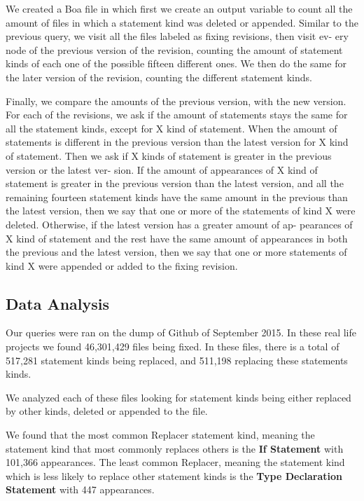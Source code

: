 \documentclass{sig-alternate-05-2015}
\begin{document}
We created a Boa file in which first we create an output variable to count all the amount of files in which a statement kind was deleted or appended. Similar to the previous query, we visit all the files labeled as fixing revisions, then visit ev- ery node of the previous version of the revision, counting the amount of statement kinds of each one of the possible fifteen different ones. We then do the same for the later version of the revision, counting the different statement kinds.

Finally, we compare the amounts of the previous version, with the new version. For each of the revisions, we ask if the amount of statements stays the same for all the statement kinds, except for X kind of statement. When the amount of statements is different in the previous version than the latest version for X kind of statement. Then we ask if X kinds of statement is greater in the previous version or the latest ver- sion. If the amount of appearances of X kind of statement is greater in the previous version than the latest version, and all the remaining fourteen statement kinds have the same amount in the previous than the latest version, then we say that one or more of the statements of kind X were deleted. Otherwise, if the latest version has a greater amount of ap- pearances of X kind of statement and the rest have the same amount of appearances in both the previous and the latest version, then we say that one or more statements of kind X were appended or added to the fixing revision.


\subsection{Data Analysis}
Our queries were ran on the dump of Github of September 2015. In these real life projects we found 46,301,429 files being fixed. In these files, there is a total of 517,281 statement kinds being replaced, and 511,198 replacing these statements kinds.

We analyzed each of these files looking for statement kinds being either replaced by other kinds, deleted or appended to the file.

We found that the most common Replacer statement kind, meaning the statement kind that most commonly replaces others is the \textbf{If Statement} with 101,366 appearances. The least common Replacer, meaning the statement kind which is less likely to replace other statement kinds is the \textbf{Type Declaration Statement} with 447 appearances.
\end{document}
